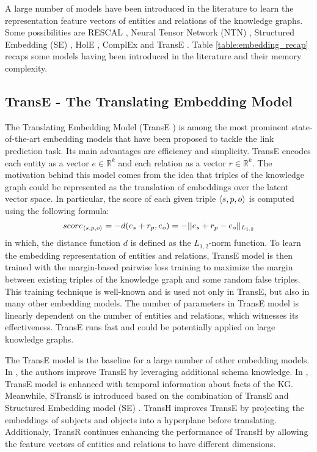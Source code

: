 A large number of models have been introduced in the literature to learn the representation feature vectors of entities and relations of the knowledge graphs. Some possibilities are RESCAL \cite{conf/icml/NickelTK11}, Neural Tensor Network (NTN) \cite{NIPS2013_5028}, Structured Embedding (SE) \cite{Bordes:2011:LSE:2900423.2900470}, HolE \cite{DBLP:conf/aaai/NickelRP16}, ComplEx \cite{DBLP:journals/corr/TrouillonWRGB16} and TransE \cite{Bordes:NIPS2013}. Table \ref{table:embedding_recap} recaps some models having been introduced in the literature and their memory complexity.

 \subsection{TransE - The Translating Embedding Model}
 The Translating Embedding Model (TransE \cite{Bordes:NIPS2013}) is among the most prominent state-of-the-art embedding models that have been proposed to tackle the link prediction task. Its main advantages are efficiency and simplicity. TransE encodes each entity as a vector $e \in \mathbb{R}^{k}$ and each relation as a vector $r \in     \mathbb{R}^{k}$. The motivation behind this model comes from the idea that triples of the knowledge graph could be represented as the translation of embeddings over the latent vector space. In particular, the score of each given triple $\langle s,p,o\rangle$ is computed using the following formula:
 \begin{displaymath}
 score_{\langle s,p,o\rangle} = -d(e_s + r_p, e_o) = -||e_s + r_p - e_o||_{L_{1,2}}
 \end{displaymath}
 in which, the distance function $d$ is defined as the $L_{1,2}$-norm function. To learn the embedding representation of entities and relations, TransE model is then trained with the margin-based pairwise loss training \cite{Bordes:NIPS2013} to maximize the margin between existing triples of the knowledge graph and some random false triples. This training technique is well-known and is used not only in TransE, but also in many other embedding models. The number of parameters in TransE model is linearly dependent on the number of entities and relations, which witnesses its effectiveness. TransE runs fast and could be potentially applied on large knowledge graphs.

 The TransE model is the baseline for a large number of other embedding models. In \cite{Minervini:2016:LSL:2851613.2851841}, the authors improve TransE by leveraging additional schema knowledge. In \cite{DBLP:conf/coling/JiangLGSCLS16}, TransE model is enhanced with temporal information about facts of the KG. Meanwhile, STransE \cite{DBLP:journals/corr/NguyenSQJ16a} is introduced based on the combination of TransE and Structured Embedding model
 (SE) \cite{Bordes:2011:LSE:2900423.2900470}. TransH \cite{Wang:2014:KGE:2893873.2894046} improves TransE by projecting the embeddings of subjects and objects into a hyperplane before translating. Additionaly, TransR \cite{Lin:2015:LER:2886521.2886624} continues enhancing the performance of TransH by allowing the feature vectors of entities and relations to have different dimensions.
